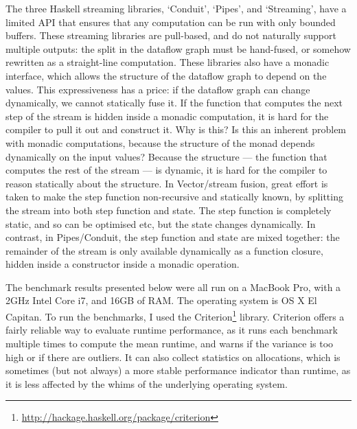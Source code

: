 The three Haskell streaming libraries, `Conduit', `Pipes', and `Streaming', have a limited API that ensures that any computation can be run with only bounded buffers.
These streaming libraries are pull-based, and do not naturally support multiple outputs: the split in the dataflow graph must be hand-fused, or somehow rewritten as a straight-line computation.
These libraries also have a monadic interface, which allows the structure of the dataflow graph to depend on the values. This expressiveness has a price: if the dataflow graph can change dynamically, we cannot statically fuse it.
If the function that computes the next step of the stream is hidden inside a monadic computation, it is hard for the compiler to pull it out and construct it.
Why is this? Is this an inherent problem with monadic computations, because the structure of the monad depends dynamically on the input values?
Because the structure --- the function that computes the rest of the stream --- is dynamic, it is hard for the compiler to reason statically about the structure.
In Vector/stream fusion, great effort is taken to make the step function non-recursive and statically known, by splitting the stream into both step function and state.
The step function is completely static, and so can be optimised etc, but the state changes dynamically.
In contrast, in Pipes/Conduit, the step function and state are mixed together: the remainder of the stream is only available dynamically as a function closure, hidden inside a constructor inside a monadic operation.



The benchmark results presented below were all run on a MacBook Pro, with a 2GHz Intel Core i7, and 16GB of RAM.
The operating system is OS X El Capitan.
To run the benchmarks, I used the Criterion\footnote{\url{http://hackage.haskell.org/package/criterion}} library.
Criterion offers a fairly reliable way to evaluate runtime performance, as it runs each benchmark multiple times to compute the mean runtime, and warns if the variance is too high or if there are outliers.
It can also collect statistics on allocations, which is sometimes (but not always) a more stable performance indicator than runtime, as it is less affected by the whims of the underlying operating system.

